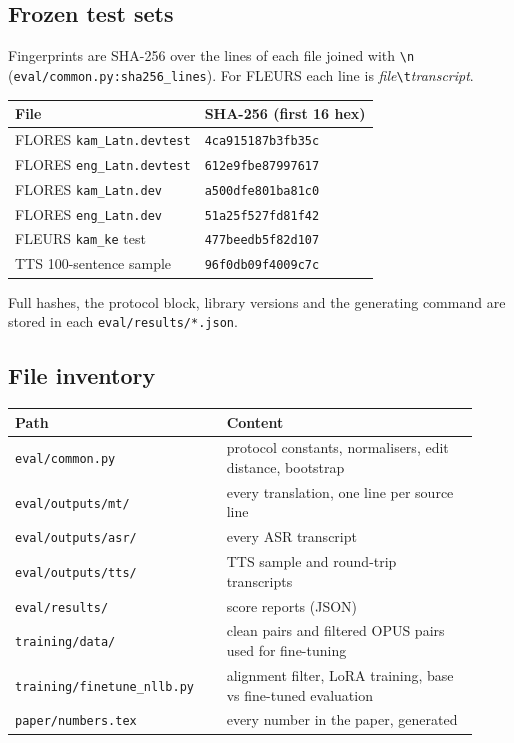 \subsection{Frozen test sets}
Fingerprints are SHA-256 over the lines of each file joined with \texttt{\textbackslash n} (\texttt{eval/common.py:sha256\_lines}). For FLEURS each line is \textit{file}\texttt{\textbackslash t}\textit{transcript}.

\begin{small}
\begin{tabular}{@{}ll@{}}
\toprule
File & SHA-256 (first 16 hex) \\
\midrule
FLORES \texttt{kam\_Latn.devtest} & \texttt{4ca915187b3fb35c} \\
FLORES \texttt{eng\_Latn.devtest} & \texttt{612e9fbe87997617} \\
FLORES \texttt{kam\_Latn.dev} & \texttt{a500dfe801ba81c0} \\
FLORES \texttt{eng\_Latn.dev} & \texttt{51a25f527fd81f42} \\
FLEURS \texttt{kam\_ke} test & \texttt{477beedb5f82d107} \\
TTS 100-sentence sample & \texttt{96f0db09f4009c7c} \\
\bottomrule
\end{tabular}
\end{small}

Full hashes, the protocol block, library versions and the generating command are stored in each \texttt{eval/results/*.json}.

\subsection{File inventory}
\begin{small}
\begin{tabular}{@{}p{0.42\linewidth}p{0.5\linewidth}@{}}
\toprule
Path & Content \\
\midrule
\texttt{eval/common.py} & protocol constants, normalisers, edit distance, bootstrap \\
\texttt{eval/outputs/mt/} & every translation, one line per source line \\
\texttt{eval/outputs/asr/} & every ASR transcript \\
\texttt{eval/outputs/tts/} & TTS sample and round-trip transcripts \\
\texttt{eval/results/} & score reports (JSON) \\
\texttt{training/data/} & clean pairs and filtered OPUS pairs used for fine-tuning \\
\texttt{training/finetune\_nllb.py} & alignment filter, LoRA training, base vs fine-tuned evaluation \\
\texttt{paper/numbers.tex} & every number in the paper, generated \\
\bottomrule
\end{tabular}
\end{small}

